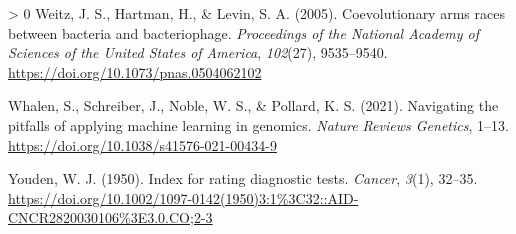\documentclass[10pt,oneside]{article}
\newlength{\cslhangindent}
\newenvironment{CSLReferences}[3] %
 {%
  \setlength{\parindent}{0pt}
  \ifodd #1 \everypar{\setlength{\hangindent}{\cslhangindent}}\ignorespaces\fi
  \ifnum #2 > 0
  \setlength{\parskip}{#2\baselineskip}
  \fi
 }%
 {}
\begin{document}
\begin{CSLReferences}{1}{0}
\leavevmode\hypertarget{ref-Weitz2005CoeArm}{}%
Weitz, J. S., Hartman, H., \& Levin, S. A. (2005). Coevolutionary arms
races between bacteria and bacteriophage. \emph{Proceedings of the
National Academy of Sciences of the United States of America},
\emph{102}(27), 9535--9540.
\url{https://doi.org/10.1073/pnas.0504062102}

\leavevmode\hypertarget{ref-Whalen2021NavPit}{}%
Whalen, S., Schreiber, J., Noble, W. S., \& Pollard, K. S. (2021).
Navigating the pitfalls of applying machine learning in genomics.
\emph{Nature Reviews Genetics}, 1--13.
\url{https://doi.org/10.1038/s41576-021-00434-9}

\leavevmode\hypertarget{ref-Youden1950IndRat}{}%
Youden, W. J. (1950). Index for rating diagnostic tests. \emph{Cancer},
\emph{3}(1), 32--35.
\url{https://doi.org/10.1002/1097-0142(1950)3:1\%3C32::AID-CNCR2820030106\%3E3.0.CO;2-3}

\end{CSLReferences}
\end{document}
